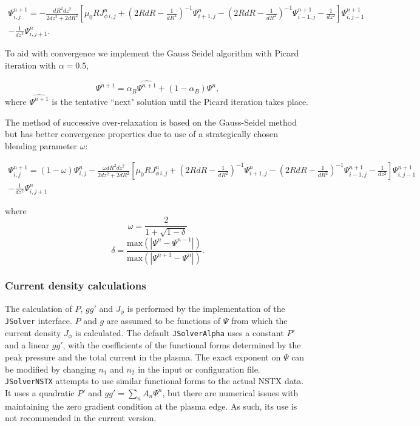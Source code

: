 \documentclass[paper=letter, fontsize=11pt]{scrartcl} %
\begin{document}
\begin{multline} \label{eq:gaussseidel}
\Psi^{n+1}_{i,j} = -\frac{dR^2 dz^2}{2dz^2 + 2dR^2} \left[ \mu_0 R J^n_{\phi \, i, j} + \left(2 R dR - \frac{1}{dR^2}\right)^{-1} \Psi^{n}_{i+1,j} - \left(2 R dR - \frac{1}{dR^2}\right)^{-1} \Psi^{n+1}_{i-1,j} - \frac{1}{dz^2} \right] \Psi^{n+1}_{i,j-1} \\ - \frac{1}{dz^2}\Psi^n_{i, j+1}. 
\end{multline}

To aid with convergence we implement the Gauss Seidel algorithm with Picard iteration with $\alpha = 0.5$, 

\begin{equation} \label{eq:picard}
\Psi^{n+1} = \alpha_B \widehat{\Psi^{n+1}} + (1 - \alpha_{B}) \Psi^n, 
\end{equation}
where $\widehat{\Psi^{n+1}}$ is the tentative ``next" solution until the Picard iteration takes place.

The method of successive over-relaxation is based on the Gauss-Seidel method but has better convergence properties due to use of a strategically chosen blending parameter $\omega$: 

\begin{multline} \label{eq:SOR}
\Psi^{n+1}_{i,j} = (1-\omega)\Psi^n_{i,j} -\frac{\omega dR^2 dz^2}{2dz^2 + 2dR^2} \left[ \mu_0 R J^n_{\phi \, i, j} + \left(2 R dR - \frac{1}{dR^2}\right)^{-1} \Psi^{n}_{i+1,j} - \left(2 R dR - \frac{1}{dR^2}\right)^{-1} \Psi^{n+1}_{i-1,j} - \frac{1}{dz^2} \right] \Psi^{n+1}_{i,j-1} \\ - \frac{1}{dz^2}\Psi^n_{i, j+1}
\end{multline}

where
\begin{equation}
\omega = \frac{2}{1 + \sqrt{1 - \delta}}
\end{equation}
\begin{equation}
\delta = \frac{\text{max} (\left| \Psi^n - \Psi^{n-1} \right| )}{\text{max} (\left| \Psi^{n+1} - \Psi^{n} \right| )}.
\end{equation}

\subsubsection{Current density calculations}
The calculation of $P$, $gg'$ and $J_\phi$ is performed by the implementation of the \texttt{JSolver} interface. $P$ and $g$ are assumed to be functions of $\Psi$ from which the current density $J_\phi$ is calculated. The default \texttt{JSolverAlpha} uses a constant $P'$ and a linear $gg'$, with the coefficients of the functional forms determined by the peak pressure and the total current in the plasma. The exact exponent on $\Psi$ can be modified by changing $n_1$ and $n_2$ in the input or configuration file. \texttt{JSolverNSTX} attempts to use similar functional forms to the actual NSTX data.  It uses a quadratic $P'$ and $gg' = \sum_n A_n\Psi^n$, but there are numerical issues with maintaining the zero gradient condition at the plasma edge. As such, its use is not recommended in the current version. 
\end{document}
